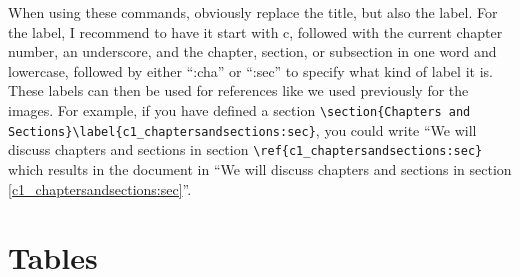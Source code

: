 When using these commands, obviously replace the title, but also the label. For
the label, I recommend to have it start with c, followed with the current
chapter number, an underscore, and the chapter, section, or subsection in one
word and lowercase, followed by either ``:cha'' or ``:sec'' to specify what kind
of label it is. These labels can then be used for references like we used
previously for the images. For example, if you have defined a section
\lstinline[language=Tex]!\section{Chapters and Sections}\label{c1_chaptersandsections:sec}!, 
you could write ``We will discuss chapters
and sections in section
\lstinline[language=Tex]!\ref{c1_chaptersandsections:sec}! which results in the
document in ``We will discuss chapters and sections in section
\ref{c1_chaptersandsections:sec}''.


\section{Tables}\label{c1_tables:sec}

